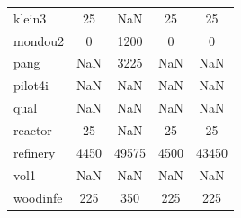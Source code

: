 \begin{longtable}{lcccc}
klein3   &       25 &   NaN &       25 &       25 \\
mondou2  &        0 &  1200 &        0 &        0 \\
pang     &      NaN &  3225 &      NaN &      NaN \\
pilot4i  &      NaN &   NaN &      NaN &      NaN \\
qual     &      NaN &   NaN &      NaN &      NaN \\
reactor  &       25 &   NaN &       25 &       25 \\
refinery &     4450 & 49575 &     4500 &    43450 \\
vol1     &      NaN &   NaN &      NaN &      NaN \\
woodinfe &      225 &   350 &      225 &      225 \\
\end{longtable}
